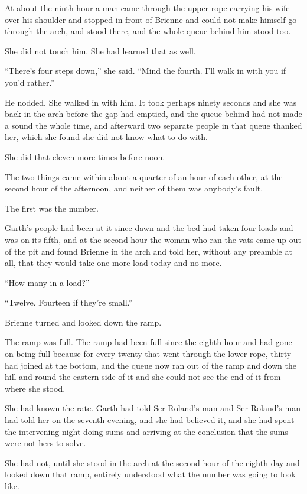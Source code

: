 At about the ninth hour a man came through the upper rope carrying his wife over his shoulder and stopped in front of Brienne and could not make himself go through the arch, and stood there, and the whole queue behind him stood too.

She did not touch him. She had learned that as well.

“There’s four steps down,” she said. “Mind the fourth. I’ll walk in with you if you’d rather.”

He nodded. She walked in with him. It took perhaps ninety seconds and she was back in the arch before the gap had emptied, and the queue behind had not made a sound the whole time, and afterward two separate people in that queue thanked her, which she found she did not know what to do with.

She did that eleven more times before noon.

\sceneBreak

The two things came within about a quarter of an hour of each other, at the second hour of the afternoon, and neither of them was anybody’s fault.

The first was the number.

Garth’s people had been at it since dawn and the bed had taken four loads and was on its fifth, and at the second hour the woman who ran the vats came up out of the pit and found Brienne in the arch and told her, without any preamble at all, that they would take one more load today and no more.

“How many in a load?”

“Twelve. Fourteen if they’re small.”

Brienne turned and looked down the ramp.

The ramp was full. The ramp had been full since the eighth hour and had gone on being full because for every twenty that went through the lower rope, thirty had joined at the bottom, and the queue now ran out of the ramp and down the hill and round the eastern side of it and she could not see the end of it from where she stood.

She had known the rate. Garth had told Ser Roland’s man and Ser Roland’s man had told her on the seventh evening, and she had believed it, and she had spent the intervening night doing sums and arriving at the conclusion that the sums were not hers to solve.

She had not, until she stood in the arch at the second hour of the eighth day and looked down that ramp, entirely understood what the number was going to look like.

